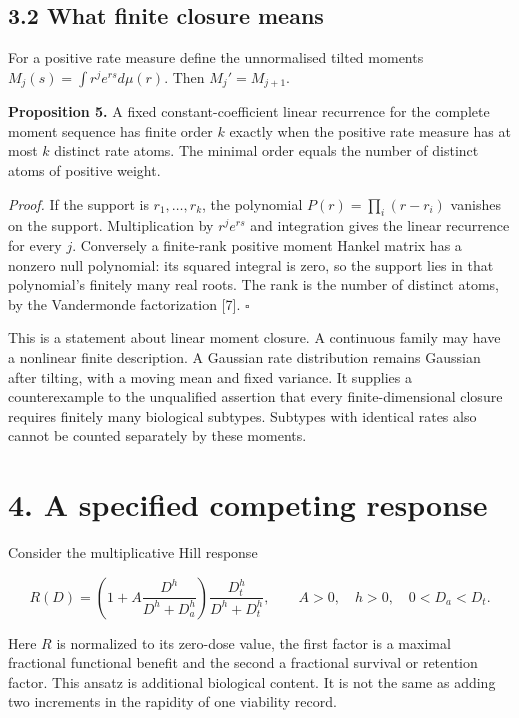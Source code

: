 \documentclass[
  11pt,
  a4paper,
]{article}
\begin{document}
\subsection{3.2 What finite closure means}\label{what-finite-closure-means}

For a positive rate measure define the unnormalised tilted moments \(M_j(s)=\int r^j e^{rs}d\mu(r)\). Then \(M_j'=M_{j+1}\).

\textbf{Proposition 5.} A fixed constant-coefficient linear recurrence for the complete moment sequence has finite order \(k\) exactly when the positive rate measure has at most \(k\) distinct rate atoms. The minimal order equals the number of distinct atoms of positive weight.

\emph{Proof.} If the support is \(r_1,\ldots,r_k\), the polynomial \(P(r)=\prod_i(r-r_i)\) vanishes on the support. Multiplication by \(r^j e^{rs}\) and integration gives the linear recurrence for every \(j\). Conversely a finite-rank positive moment Hankel matrix has a nonzero null polynomial: its squared integral is zero, so the support lies in that polynomial's finitely many real roots. The rank is the number of distinct atoms, by the Vandermonde factorization {[}7{]}. \(\square\)

This is a statement about linear moment closure. A continuous family may have a nonlinear finite description. A Gaussian rate distribution remains Gaussian after tilting, with a moving mean and fixed variance. It supplies a counterexample to the unqualified assertion that every finite-dimensional closure requires finitely many biological subtypes. Subtypes with identical rates also cannot be counted separately by these moments.

\section{4. A specified competing response}\label{a-specified-competing-response}

Consider the multiplicative Hill response

\[R(D)=\left(1+A\frac{D^h}{D^h+D_a^h}\right)
\frac{D_t^h}{D^h+D_t^h},\qquad A>0,\quad h>0,
\quad0<D_a<D_t.\]

Here \(R\) is normalized to its zero-dose value, the first factor is a maximal fractional functional benefit and the second a fractional survival or retention factor. This ansatz is additional biological content. It is not the same as adding two increments in the rapidity of one viability record.
\end{document}
